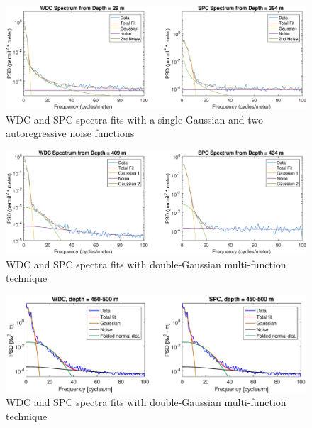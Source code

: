 \documentclass[draft, jgrga]{AGUTeX}
\begin{document}
\begin{figure}
\includegraphics[width=.9\linewidth]{GRR_fit.eps}
\caption{WDC and SPC spectra fits with a single Gaussian and two autoregressive noise functions}\label{GRR_fit}
\end{figure}

\begin{figure}
\includegraphics[width=.9\linewidth]{2_gauss.eps}
\caption{WDC and SPC spectra fits with double-Gaussian multi-function technique}\label{2_gauss}
\end{figure}

\begin{figure}
	\includegraphics[width=1.1\linewidth]{folded_normal_gauss_spectrum.eps}
	\caption{WDC and SPC spectra fits with double-Gaussian multi-function technique}\label{folded_normal_gauss_spectrum}
\end{figure}
\end{document}
